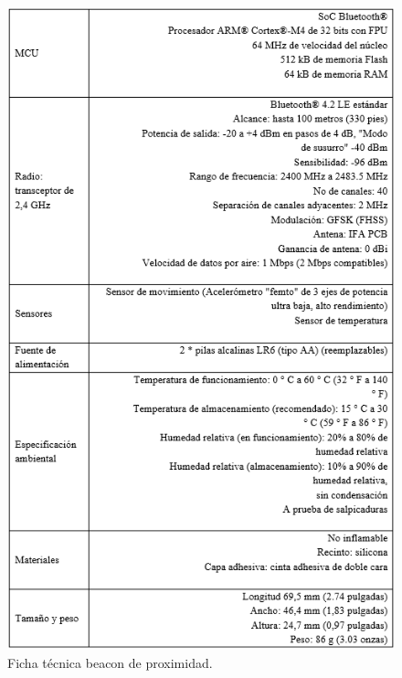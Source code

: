 \documentclass[conference,compsoc,onecolumn]{IEEEtran}
\begin{document}
\clearpage

\begin{figure}[H]
\centering
\includegraphics[keepaspectratio, scale=1]{Imagenes/Imagen2.png}
\caption{Ficha técnica beacon de proximidad.}
\end{figure}

\clearpage
\end{document}
